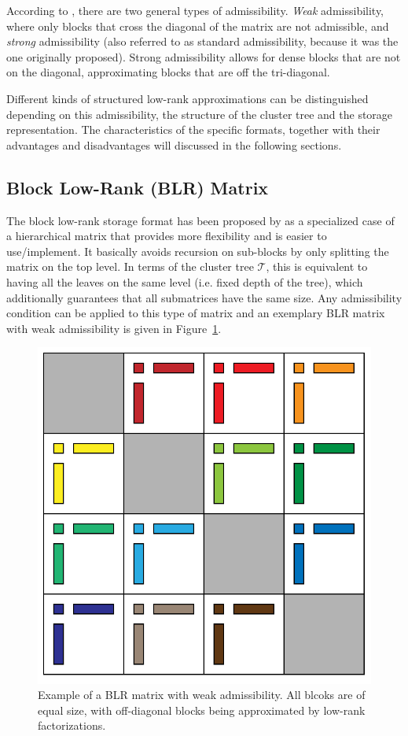 \noindent According to \cite{hackbusch_hierarchical_2004}, there are two general types of admissibility. \textit{Weak} admissibility, where only blocks that cross the diagonal of the matrix are not admissible, and \textit{strong} admissibility (also referred to as standard admissibility, because it was the one originally proposed). Strong admissibility allows for dense blocks that are not on the diagonal, approximating blocks that are off the tri-diagonal.

Different kinds of structured low-rank approximations can be distinguished depending on this admissibility, the structure of the cluster tree and the storage representation. The characteristics of the specific formats, together with their advantages and disadvantages will discussed in the following sections.

\subsection{Block Low-Rank (BLR) Matrix}
\label{sec:blr}

The block low-rank storage format has been proposed by \cite{amestoy_improving_2015} as a specialized case of a hierarchical matrix that provides more flexibility and is easier to use/implement. It basically avoids recursion on sub-blocks by only splitting the matrix on the top level. In terms of the cluster tree $\mathcal{T}$, this is equivalent to having all the leaves on the same level (i.e. fixed depth of the tree), which additionally guarantees that all submatrices have the same size. Any admissibility condition can be applied to this type of matrix and an exemplary BLR matrix with weak admissibility is given in Figure~\hyperref[fig:blr]{\ref{fig:blr}}.

\begin{figure}[h]
    \centering
    \includegraphics[width=0.6\linewidth]{chapters/4_hierarchical_matrices/figures/BLR.pdf}
    \caption[Block Low-Rank Matrix]{Example of a BLR matrix with weak admissibility. All blcoks are of equal size, with off-diagonal blocks being approximated by low-rank factorizations.}
    \label{fig:blr}
\end{figure}

